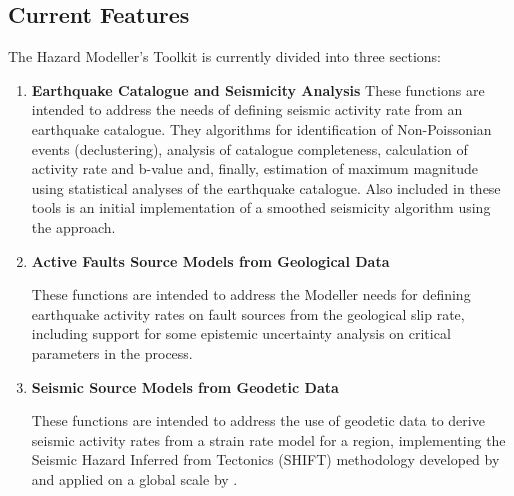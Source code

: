 \subsection{Current Features}

The Hazard Modeller's Toolkit is currently divided into three sections: 

\begin{enumerate}
\item \textbf{Earthquake Catalogue and Seismicity Analysis}
    These functions are intended to address the needs of defining seismic activity rate from an earthquake catalogue. They algorithms for identification of Non-Poissonian events (declustering), analysis of catalogue completeness, calculation of activity rate and b-value and, finally, estimation of maximum magnitude using statistical analyses of the earthquake catalogue. Also included in these tools is an initial implementation of a smoothed seismicity algorithm using the \textcite{frankel1995} approach.
     
\item \textbf{Active Faults Source Models from Geological Data}

    These functions are intended to address the Modeller needs for defining earthquake activity rates on fault sources from the geological slip rate, including support for some epistemic uncertainty analysis on critical parameters in the process.

\item \textbf{Seismic Source Models from Geodetic Data}

    These functions are intended to address the use of geodetic data to derive seismic activity rates from a strain rate model for a region, implementing the Seismic Hazard Inferred from Tectonics (SHIFT) methodology developed by \textcite{BirdLiu2007} and applied on a global scale by \textcite{Bird_etal2010}.
\end{enumerate}

